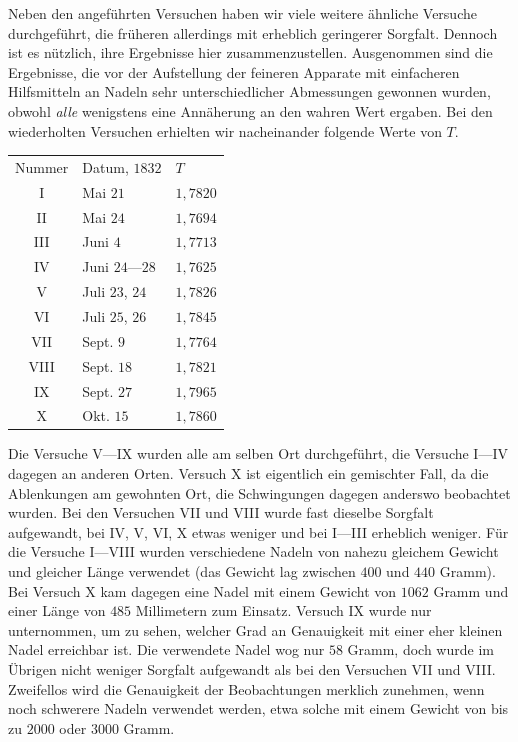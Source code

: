Neben den angeführten Versuchen haben wir viele weitere ähnliche Versuche durchgeführt, die früheren allerdings mit erheblich geringerer Sorgfalt. Dennoch ist es nützlich, ihre Ergebnisse hier zusammenzustellen. Ausgenommen sind die Ergebnisse, die vor der Aufstellung der feineren Apparate mit einfacheren Hilfsmitteln an Nadeln sehr unterschiedlicher Abmessungen gewonnen wurden, obwohl \textit{alle} wenigstens eine Annäherung an den wahren Wert ergaben. Bei den wiederholten Versuchen erhielten wir nacheinander folgende Werte von $T$.
\begin{center}
\begin{tabular}{c|l|l}
Nummer&Datum, $1832$&$T$\\
I&Mai $21$&$1{,}7820$\\
II&Mai $24$&$1{,}7694$\\
III&Juni $4$&$1{,}7713$\\
IV&Juni $24$—$28$&$1{,}7625$\\
V&Juli $23$, $24$&$1{,}7826$\\
VI&Juli $25$, $26$&$1{,}7845$\\
VII&Sept. $9$&$1{,}7764$\\
VIII&Sept. $18$&$1{,}7821$\\
IX&Sept. $27$&$1{,}7965$\\
X&Okt. $15$&$1{,}7860$
\end{tabular}
\end{center}
Die Versuche V—IX wurden alle am selben Ort durchgeführt, die Versuche I—IV dagegen an anderen Orten. Versuch X ist eigentlich ein gemischter Fall, da die Ablenkungen am gewohnten Ort, die Schwingungen dagegen anderswo beobachtet wurden. Bei den Versuchen VII und VIII wurde fast dieselbe Sorgfalt aufgewandt, bei IV, V, VI, X etwas weniger und bei I—III erheblich weniger. Für die Versuche I—VIII wurden verschiedene Nadeln von nahezu gleichem Gewicht und gleicher Länge verwendet (das Gewicht lag zwischen $400$ und $440$ Gramm). Bei Versuch X kam dagegen eine Nadel mit einem Gewicht von $1062$ Gramm und einer Länge von $485$ Millimetern zum Einsatz. Versuch IX wurde nur unternommen, um zu sehen, welcher Grad an Genauigkeit mit einer eher kleinen Nadel erreichbar ist. Die verwendete Nadel wog nur $58$ Gramm, doch wurde im Übrigen nicht weniger Sorgfalt aufgewandt als bei den Versuchen VII und VIII. Zweifellos wird die Genauigkeit der Beobachtungen merklich zunehmen, wenn noch schwerere Nadeln verwendet werden, etwa solche mit einem Gewicht von bis zu $2000$ oder $3000$ Gramm.

